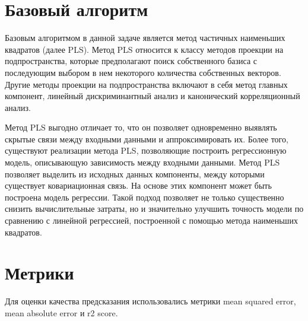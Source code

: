 \section{Базовый алгоритм}
Базовым алгоритмом в данной задаче является метод частичных наименьших квадратов (далее PLS).
Метод PLS относится к классу методов проекции на подпространства, которые предполагают поиск собственного базиса с последующим выбором в нем некоторого количества собственных векторов. Другие методы проекции на подпространства включают в себя метод главных компонент, линейный дискриминантный анализ и канонический корреляционный анализ. 

Метод PLS выгодно отличает то, что он позволяет одновременно выявлять скрытые связи между входными данными и аппроксимировать их. Более того, существуют реализации метода PLS, позволяющие построить регрессионную модель, описывающую зависимость между входными данными. 
Метод  PLS позволяет выделить из исходных данных компоненты, между которыми существует ковариационная связь. На основе этих компонент может быть построена модель регрессии. Такой подход позволяет не только существенно снизить вычислительные затраты, но и значительно улучшить точность модели по сравнению с линейной регрессией, построенной с помощью метода наименьших квадратов. 

\section{Метрики}
Для оценки качества предсказания использовались метрики mean squared error, mean absolute error и r2 score.

